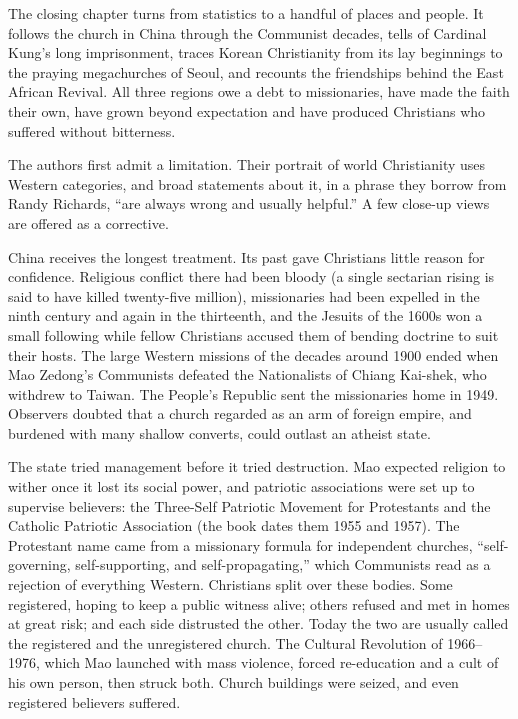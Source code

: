 
\begin{inbrief}
The closing chapter turns from statistics to a handful of places and people. It follows the church in
China through the Communist decades, tells of Cardinal Kung's long imprisonment, traces Korean
Christianity from its lay beginnings to the praying megachurches of Seoul, and recounts the
friendships behind the East African Revival. All three regions owe a debt to missionaries, have made
the faith their own, have grown beyond expectation and have produced Christians who suffered without
bitterness.
\end{inbrief}

The authors first admit a limitation. Their portrait of world Christianity uses Western categories,
and broad statements about it, in a phrase they borrow from Randy Richards, ``are always wrong and
usually helpful.'' A few close-up views are offered as a corrective.

China receives the longest treatment. Its past gave Christians little reason for confidence.
Religious conflict there had been bloody (a single sectarian rising is said to have killed
twenty-five million), missionaries had been expelled in the ninth century and again in the
thirteenth, and the Jesuits of the 1600s won a small following while fellow Christians accused them
of bending doctrine to suit their hosts. The large Western missions of the decades around 1900 ended
when Mao Zedong's Communists defeated the Nationalists of Chiang Kai-shek, who withdrew to Taiwan.
The People's Republic sent the missionaries home in 1949. Observers doubted that a church regarded as
an arm of foreign empire, and burdened with many shallow converts, could outlast an atheist state.

The state tried management before it tried destruction. Mao expected religion to wither once it lost
its social power, and patriotic associations were set up to supervise believers: the Three-Self
Patriotic Movement for Protestants and the Catholic Patriotic Association (the book dates them 1955
and 1957). The Protestant name came from a missionary formula for independent churches,
``self-governing, self-supporting, and self-propagating,'' which Communists read as a rejection of
everything Western. Christians split over these bodies. Some registered, hoping to keep a public
witness alive; others refused and met in homes at great risk; and each side distrusted the other.
Today the two are usually called the registered and the unregistered church. The Cultural Revolution
of 1966--1976, which Mao launched with mass violence, forced re-education and a cult of his own
person, then struck both. Church buildings were seized, and even registered believers suffered.

